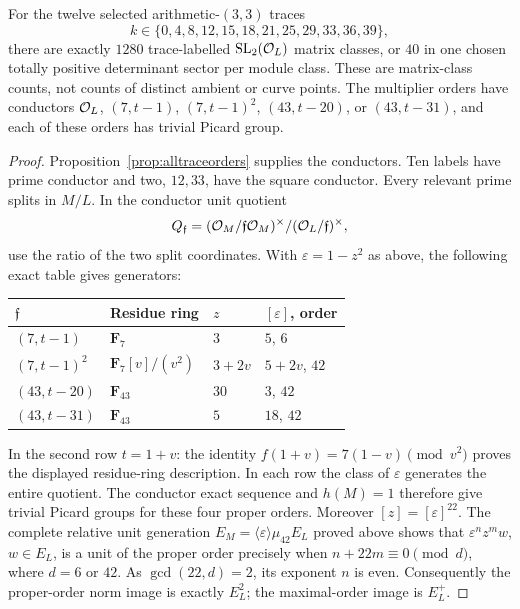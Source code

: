\begin{theorem}[The nonmaximal $d=3$ classes]\label{thm:d3classes}
For the twelve selected arithmetic-$(3,3)$ traces
\[
 k\in\{0,4,8,12,15,18,21,25,29,33,36,39\},
\]
there are exactly $1280$ trace-labelled $\operatorname{SL}_2(\mathcal O_L)$ matrix classes,
or $40$ in one chosen totally positive determinant sector per module class.
These are matrix-class counts, not counts of distinct ambient or curve points.
The multiplier orders have conductors
$\mathcal O_L$, $(7,t-1)$, $(7,t-1)^2$, $(43,t-20)$, or $(43,t-31)$,
and each of these orders has trivial Picard group.
\end{theorem}
\begin{proof}
Proposition~\ref{prop:alltraceorders} supplies the conductors.
Ten labels have prime conductor and two, $12,33$, have the square conductor.
Every relevant prime splits in $M/L$. In the conductor unit quotient
\[
 Q_{\mathfrak f}=(\mathcal O_M/\mathfrak f\mathcal O_M)^\times/
                    (\mathcal O_L/\mathfrak f)^\times,
\]
use the ratio of the two split coordinates. With
$\varepsilon=1-z^2$ as above, the following exact table gives generators:
\begin{center}
\begin{tabular}{llll}
\toprule
$\mathfrak f$ & Residue ring & $z$ & $[\varepsilon]$, order\\
\midrule
$(7,t-1)$ & $\mathbf F_7$ & $3$ & $5$, $6$\\
$(7,t-1)^2$ & $\mathbf F_7[v]/(v^2)$ & $3+2v$ & $5+2v$, $42$\\
$(43,t-20)$ & $\mathbf F_{43}$ & $30$ & $3$, $42$\\
$(43,t-31)$ & $\mathbf F_{43}$ & $5$ & $18$, $42$\\
\bottomrule
\end{tabular}
\end{center}
In the second row $t=1+v$: the identity
$f(1+v)=7(1-v)\pmod{v^2}$ proves the displayed residue-ring description.
In each row the class of $\varepsilon$ generates the entire quotient.
The conductor exact sequence and $h(M)=1$ therefore give trivial Picard
groups for these four proper orders. Moreover $[z]=[\varepsilon]^{22}$.
The complete relative unit generation
$E_M=\langle\varepsilon\rangle\mu_{42}E_L$ proved above shows that
$\varepsilon^n z^m w$, $w\in E_L$, is a unit of the proper order
precisely when $n+22m\equiv0\pmod d$, where $d=6$ or $42$.
As $\gcd(22,d)=2$, its exponent $n$ is even. Consequently the proper-order
norm image is exactly $E_L^2$; the maximal-order image is $E_L^+$.


\end{proof}
